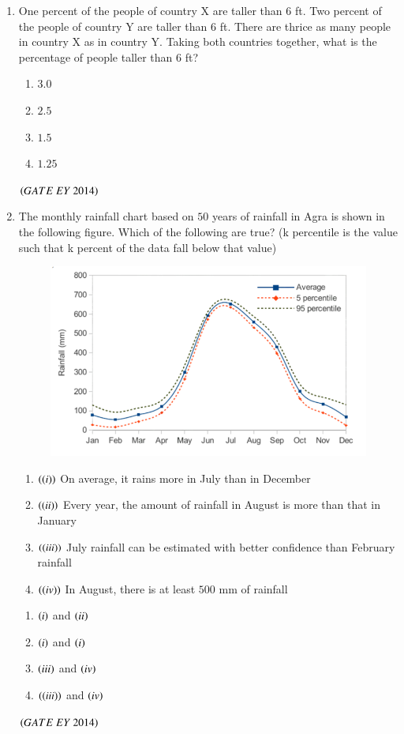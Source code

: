\documentclass[journal]{IEEEtran}
\numberwithin{equation}{enumi}
\numberwithin{figure}{enumi}
\begin{document}
\begin{enumerate}
    \item One percent of the people of country X are taller than $6$ ft. Two percent of the people of country Y are taller than $6$ ft. There are thrice as many people in country X as in country Y. Taking both countries together, what is the percentage of people taller than $6$ ft?
    \begin{multicols}{4}
    \begin{enumerate}
        \item $3.0$
        \item $2.5$
        \item $1.5$
        \item $1.25$
    \end{enumerate}
    \end{multicols}
    \hfill{$\brak{ GATE\ EY\ 2014}$}
    \bigskip

    \item The monthly rainfall chart based on $50$ years of rainfall in Agra is shown in the following figure. Which of the following are true? (k percentile is the value such that k percent of the data fall below that value)
    \begin{figure}[H]
    \centering
    \includegraphics[width=0.8\columnwidth]{figs/2.png}
    \caption{}
    \label{fig:2}
   \end{figure}
    \begin{enumerate}
        \item $\left((i)\right)$ On average, it rains more in July than in December
        \item $\left((ii)\right)$ Every year, the amount of rainfall in August is more than that in January
        \item $\left((iii)\right)$ July rainfall can be estimated with better confidence than February rainfall
        \item $\left((iv)\right)$ In August, there is at least $500$ mm of rainfall
    \end{enumerate}
    \begin{multicols}{2}
    \begin{enumerate}
        \item $\left(i\right)$ and $\left(ii\right)$
        \item $\left(i\right)$ and $\left(i\right)$
        \item $\left(iii\right)$ and $\left(iv\right)$
        \item $\left((iii)\right)$ and $\left(iv\right)$
    \end{enumerate}
    \end{multicols}
    \hfill{$\brak{ GATE\ EY\ 2014}$}
\end{enumerate}
\end{document}
